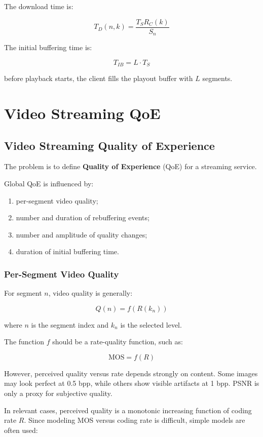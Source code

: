 The download time is:

\[
T_D(n,k) = \frac{T_S R_C(k)}{S_n}
\]

The initial buffering time is:

\[
T_{IB} = L \cdot T_S
\]

before playback starts, the client fills the playout buffer with $L$ segments.

\section{Video Streaming QoE}

\subsection{Video Streaming Quality of Experience}

The problem is to define \textbf{Quality of Experience} (QoE) for a streaming service.

Global QoE is influenced by:

\begin{enumerate}
\item per-segment video quality;
\item number and duration of rebuffering events;
\item number and amplitude of quality changes;
\item duration of initial buffering time.
\end{enumerate}

\subsubsection{Per-Segment Video Quality}

For segment $n$, video quality is generally:

\[
Q(n) = f(R(k_n))
\]

where $n$ is the segment index and $k_n$ is the selected level.

The function $f$ should be a rate-quality function, such as:

\[
\text{MOS} = f(R)
\]

However, perceived quality versus rate depends strongly on content. Some images may look perfect at 0.5 bpp, while others show visible artifacts at 1 bpp. PSNR is only a proxy for subjective quality.

In relevant cases, perceived quality is a monotonic increasing function of coding rate $R$. Since modeling MOS versus coding rate is difficult, simple models are often used:

